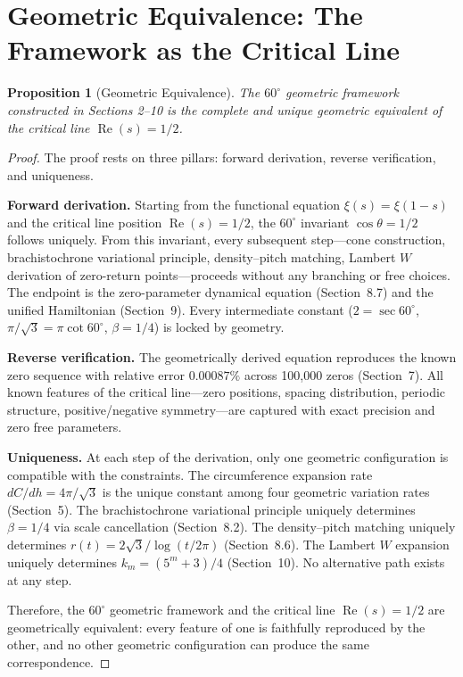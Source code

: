 \documentclass[12pt,a4paper]{article}
\newtheorem{proposition}[theorem]{Proposition}
\begin{document}
\section{Geometric Equivalence: The Framework as the Critical Line}

\begin{proposition}[Geometric Equivalence]
\label{prop:equivalence}
The $60^\circ$ geometric framework constructed in Sections 2--10 is the complete and unique geometric equivalent of the critical line $\operatorname{Re}(s)=1/2$.
\end{proposition}

\begin{proof}
The proof rests on three pillars: forward derivation, reverse verification, and uniqueness.

\textbf{Forward derivation.} Starting from the functional equation $\xi(s)=\xi(1-s)$ and the critical line position $\operatorname{Re}(s)=1/2$, the $60^\circ$ invariant $\cos\theta = 1/2$ follows uniquely. From this invariant, every subsequent step---cone construction, brachistochrone variational principle, density--pitch matching, Lambert $W$ derivation of zero-return points---proceeds without any branching or free choices. The endpoint is the zero-parameter dynamical equation (Section~8.7) and the unified Hamiltonian (Section~9). Every intermediate constant ($2 = \sec 60^\circ$, $\pi/\sqrt{3} = \pi\cot 60^\circ$, $\beta = 1/4$) is locked by geometry.

\textbf{Reverse verification.} The geometrically derived equation reproduces the known zero sequence with relative error $0.00087\%$ across 100,000 zeros (Section~7). All known features of the critical line---zero positions, spacing distribution, periodic structure, positive/negative symmetry---are captured with exact precision and zero free parameters.

\textbf{Uniqueness.} At each step of the derivation, only one geometric configuration is compatible with the constraints. The circumference expansion rate $dC/dh = 4\pi/\sqrt{3}$ is the unique constant among four geometric variation rates (Section~5). The brachistochrone variational principle uniquely determines $\beta = 1/4$ via scale cancellation (Section~8.2). The density--pitch matching uniquely determines $r(t) = 2\sqrt{3}/\log(t/2\pi)$ (Section~8.6). The Lambert $W$ expansion uniquely determines $k_m = (5^m+3)/4$ (Section~10). No alternative path exists at any step.

Therefore, the $60^\circ$ geometric framework and the critical line $\operatorname{Re}(s)=1/2$ are geometrically equivalent: every feature of one is faithfully reproduced by the other, and no other geometric configuration can produce the same correspondence.
\end{proof}
\end{document}
